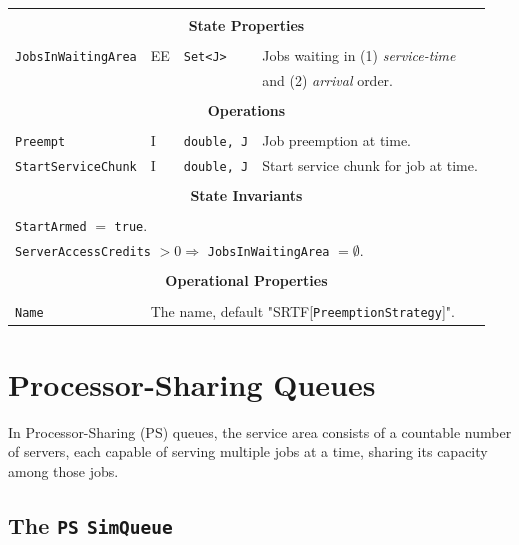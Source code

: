 \documentclass[12pt]{book}
\begin{document}
\begin{tabular}{|l|l|l|l|}
\hline
\multicolumn{4}{|c|}{} \\
\multicolumn{4}{|c|}{\bf State  Properties} \\
\multicolumn{4}{|c|}{} \\
\hline
\lstinline|JobsInWaitingArea| & EE & \lstinline|Set<J>| & Jobs waiting in (1) {\em service-time\/} \\
                              &    &                    & and (2) {\em arrival\/} order. \\
\hline
\multicolumn{4}{|c|}{} \\
\multicolumn{4}{|c|}{\bf Operations} \\
\multicolumn{4}{|c|}{} \\
\hline
\lstinline|Preempt| & I & \lstinline|double, J| & Job preemption at time.\\
\hline
\lstinline|StartServiceChunk| & I & \lstinline|double, J| & Start service chunk for job at time.\\
\hline
\multicolumn{4}{|c|}{} \\
\multicolumn{4}{|c|}{\bf State  Invariants} \\
\multicolumn{4}{|c|}{} \\
\hline
\multicolumn{4}{|l|}{\lstinline|StartArmed| $=$ \lstinline|true|.} \\
\multicolumn{4}{|l|}{\lstinline|ServerAccessCredits| $> 0 \Rightarrow$ \lstinline|JobsInWaitingArea| $= \emptyset$.} \\
\hline
\multicolumn{4}{|c|}{} \\
\multicolumn{4}{|c|}{\bf Operational Properties} \\
\multicolumn{4}{|c|}{} \\
\hline
\lstinline|Name| & \multicolumn{3}{|l|}{The name, default "SRTF[\lstinline|PreemptionStrategy|]".} \\
\hline
\end{tabular}

\section{Processor-Sharing Queues}

In Processor-Sharing (PS) queues,
  the service area consists of a countable number of servers,
  each capable of serving multiple jobs at a time,
  sharing its capacity among those jobs.
  
\subsection{The \lstinline{PS} \lstinline{SimQueue}}
\label{sec:PS}
\end{document}

